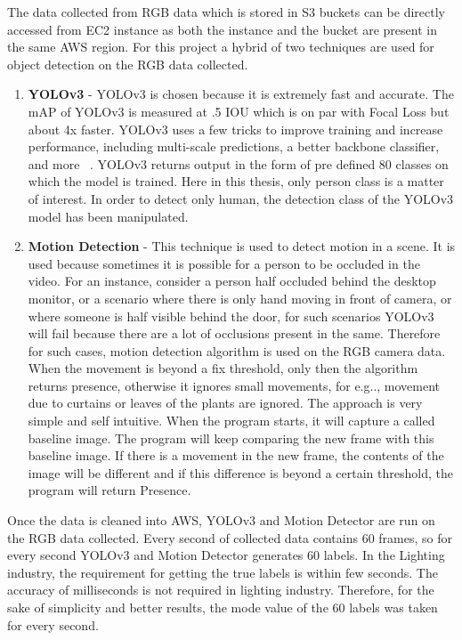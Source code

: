 The data collected from RGB data which is stored in S3 buckets can be directly accessed from EC2 instance as both the instance and the bucket are present in the same AWS region.  For this project a hybrid of  two techniques are used for object detection on the RGB data collected. 
\begin{enumerate}
    \item \textbf{YOLOv3} - YOLOv3 is chosen because it is extremely fast and accurate. The mAP of YOLOv3 is measured at .5 IOU  which is on par with Focal Loss but about 4x faster. YOLOv3 uses a few tricks to improve training and increase performance, including multi-scale predictions, a better backbone classifier, and more ~\cite{yolo_time}. YOLOv3 returns output in the form of pre defined 80 classes on which the model is trained. Here in this thesis, only person class is a matter of interest. In order to detect only human, the detection class of the YOLOv3 model has been manipulated.
    \item \textbf{Motion Detection} - This technique is used to detect motion in a scene. It is used because sometimes it is possible for a person to be occluded in the video. For an instance, consider a person half occluded behind the desktop monitor, or a scenario where there is only hand moving in front of camera, or where someone is half visible behind the door, for such scenarios YOLOv3 will fail because there are a lot of occlusions present in the same. Therefore for such cases, motion detection algorithm is used on the RGB camera data. When the movement is beyond a fix threshold, only then the algorithm returns presence, otherwise it ignores small movements, for e.g.., movement due to curtains or leaves of the plants are ignored. The approach is very simple and self intuitive. When the program starts, it will capture a called baseline image. The program will keep comparing the new frame with this baseline image. If there is a movement in the new frame, the contents of the image will be different and if this difference is beyond a certain threshold,  the program will return Presence.
\end{enumerate}

Once the data is cleaned into AWS, YOLOv3 and  Motion Detector are run on the RGB data collected. Every second of collected data contains 60 frames, so for every second YOLOv3 and Motion Detector generates 60 labels. In the Lighting industry, the requirement for getting the true labels is within few seconds. The accuracy of milliseconds is not required in lighting industry. Therefore, for the sake of simplicity and better results, the mode value of the 60 labels was taken for every second. 

